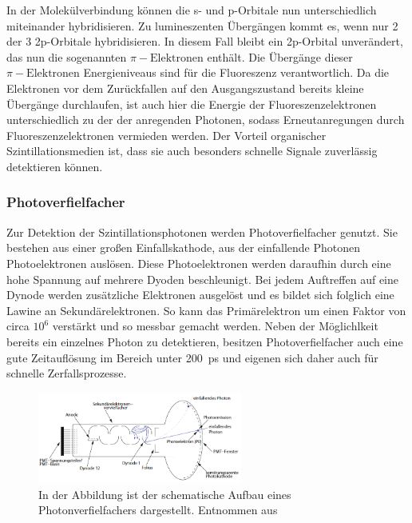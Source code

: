                 In der Molekülverbindung können die s- und p-Orbitale nun unterschiedlich miteinander hybridisieren. Zu lumineszenten Übergängen kommt es, wenn nur 2 der 3 2p-Orbitale hybridisieren. In diesem
                Fall bleibt ein 2p-Orbital unverändert, das nun die sogenannten $\pi-\text{Elektronen}$ enthält. Die Übergänge dieser $\pi-\text{Elektronen}$ Energieniveaus sind für die Fluoreszenz verantwortlich.
                Da die Elektronen vor dem Zurückfallen auf den Ausgangszustand bereits kleine Übergänge durchlaufen, ist auch hier die Energie der Fluoreszenzelektronen unterschiedlich zu der der anregenden
                Photonen, sodass Erneutanregungen durch Fluoreszenzelektronen vermieden werden. Der Vorteil organischer Szintillationsmedien ist, dass sie auch besonders schnelle Signale zuverlässig 
                detektieren können.

            \subsubsection*{Photoverfielfacher}
                Zur Detektion der Szintillationsphotonen werden Photoverfielfacher genutzt. Sie bestehen aus einer großen Einfallskathode, aus der einfallende Photonen Photoelektronen auslösen. Diese
                Photoelektronen werden daraufhin durch eine hohe Spannung auf mehrere Dyoden beschleunigt. Bei jedem Auftreffen auf eine Dynode werden zusätzliche Elektronen ausgelöst und es bildet sich 
                folglich eine Lawine an Sekundärelektronen. So kann das Primärelektron um einen Faktor von circa $10^6$ verstärkt und so messbar gemacht werden. Neben der Möglichlkeit bereits ein einzelnes 
                Photon zu detektieren, besitzen Photoverfielfacher auch eine gute Zeitauflösung im  Bereich unter \SI{200}{\pico\second} und eigenen sich daher auch für schnelle Zerfallsprozesse.

                \FloatBarrier

                \begin{figure}[h]
                  \centering
                  \includegraphics[width = 0.6\textwidth]{pictures/photomultiplier.png}
                  \caption{In der Abbildung ist der schematische Aufbau eines Photonverfielfachers dargestellt. Entnommen aus \cite{kolanoski_teilchendetektoren_2016}}
                  \label{fig:photomultiplier}
                \end{figure}
        
                \FloatBarrier
        
                \noindent 

